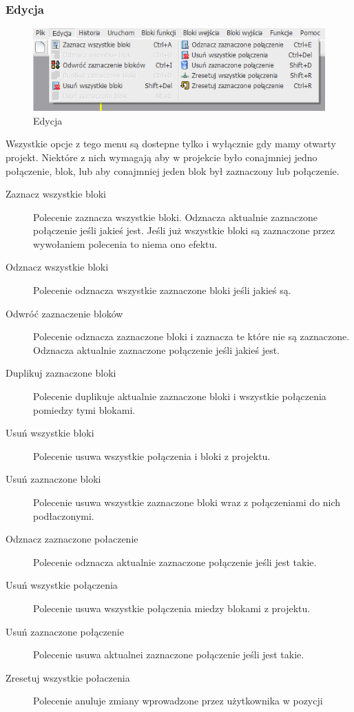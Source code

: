 \documentclass[a4paper,10pt]{article}
\begin{document}
\subsubsection{Edycja}
\begin{figure}[h]
 \centering
 \includegraphics[scale=0.5]{edycja}
 \caption{Edycja}
 \label{fig:edition}
\end{figure}
Wszystkie opcje z tego menu są dostepne tylko i wyłącznie gdy mamy otwarty projekt. Niektóre z nich wymagają aby w projekcie było conajmniej jedno połączenie, blok, lub aby conajmniej jeden blok był zaznaczony lub połączenie.
\begin{description}
\item[Zaznacz wszystkie bloki] Polecenie zaznacza wszystkie bloki. Odznacza aktualnie zaznaczone połączenie jeśli jakieś jest. Jeśli już wszystkie bloki są zaznaczone przez wywołaniem polecenia to niema ono efektu. 
\item[Odznacz wszystkie bloki] Polecenie odznacza wszystkie zaznaczone bloki jeśli jakieś są.
\item[Odwróć zaznaczenie bloków] Polecenie odznacza zaznaczone bloki i zaznacza te które nie są zaznaczone. Odznacza aktualnie zaznaczone połączenie jeśli jakieś jest.
\item[Duplikuj zaznaczone bloki] Polecenie duplikuje aktualnie zaznaczone bloki i wszystkie połączenia pomiedzy tymi blokami.
\item[Usuń wszystkie bloki] Polecenie usuwa wszystkie połączenia i bloki z projektu.
\item[Usuń zaznaczone bloki] Polecenie usuwa wszystkie zaznaczone bloki wraz z połączeniami do nich podłaczonymi.
\item[Odznacz zaznaczone połaczenie] Polecenie odznacza aktualnie zaznaczone połączenie jeśli jest takie.
\item[Usuń wszystkie połączenia] Polecenie usuwa wszystkie połączenia miedzy blokami z projektu.
\item[Usuń zaznaczone połączenie] Polecenie usuwa aktualnei zaznaczone połączenie jeśli jest takie.
\item[Zresetuj wszystkie połaczenia] Polecenie anuluje zmiany wprowadzone przez użytkownika w pozycji
\end{description}
\end{document}
